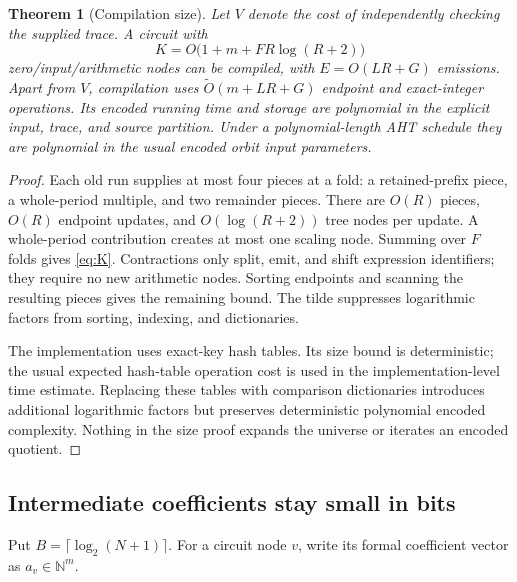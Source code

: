 \documentclass[11pt]{article}
\newtheorem{theorem}{Theorem}[section]
\theoremstyle{definition}\newtheorem{definition}[theorem]{Definition}
\theoremstyle{remark}\newtheorem{remark}[theorem]{Remark}
\newcommand{\N}{\mathbb N}
\begin{document}
\begin{theorem}[Compilation size]
\label{thm:size}
Let $V$ denote the cost of independently checking the supplied trace. A circuit
with
\begin{equation}
 K=O\bigl(1+m+FR\log(R+2)\bigr)
 \label{eq:K}
\end{equation}
zero/input/arithmetic nodes can be compiled, with $E=O(LR+G)$ emissions.
Apart from $V$, compilation uses
$\widetilde O(m+LR+G)$ endpoint and exact-integer operations. Its encoded running
time and storage are polynomial in the explicit input, trace, and source
partition. Under a polynomial-length AHT schedule they are polynomial in the
usual encoded orbit input parameters.
\end{theorem}
\begin{proof}
Each old run supplies at most four pieces at a fold: a retained-prefix piece,
a whole-period multiple, and two remainder pieces. There are $O(R)$ pieces,
$O(R)$ endpoint updates, and $O(\log(R+2))$ tree nodes per update. A whole-period
contribution creates at most one scaling node. Summing over $F$ folds gives
\eqref{eq:K}. Contractions only split, emit, and shift expression identifiers;
they require no new arithmetic nodes. Sorting endpoints and scanning the
resulting pieces gives the remaining bound. The tilde suppresses logarithmic
factors from sorting, indexing, and dictionaries.

The implementation uses exact-key hash tables. Its size bound is deterministic;
the usual expected hash-table operation cost is used in the implementation-level
time estimate. Replacing these tables with comparison dictionaries introduces
additional logarithmic factors but preserves deterministic polynomial encoded
complexity. Nothing in the size proof expands the universe or iterates an encoded
quotient.
\end{proof}

\subsection{Intermediate coefficients stay small in bits}
Put $B=\lceil\log_2(N+1)\rceil$. For a circuit node $v$, write its formal
coefficient vector as $a_v\in\N^m$.
\end{document}
